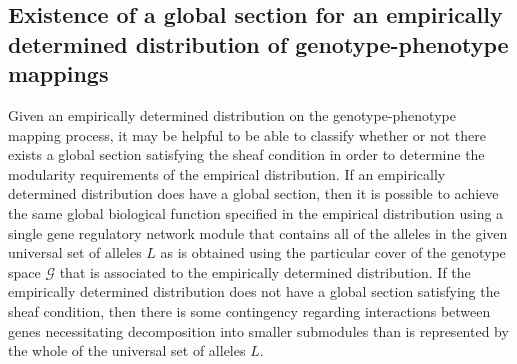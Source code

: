 \documentclass[10pt]{article}
\begin{document}
\subsection*{Existence of a global section for an empirically determined distribution of genotype-phenotype mappings}
Given an empirically determined distribution on the genotype-phenotype mapping process, it may be helpful to be able to classify whether or not there exists a global section satisfying the sheaf condition in order to determine the modularity requirements of the empirical distribution. If an empirically determined distribution does have a global section, then it is possible to achieve the same global biological function specified in the empirical distribution using a single gene regulatory network module that contains all of the alleles in the given universal set of alleles $L$ as is obtained using the particular cover of the genotype space $\mathcal{G}$ that is associated to the empirically determined distribution. If the empirically determined distribution does not have a global section satisfying the sheaf condition, then there is some contingency regarding interactions between genes necessitating decomposition into smaller submodules than is represented by the whole of the universal set of alleles $L$.
\end{document}
